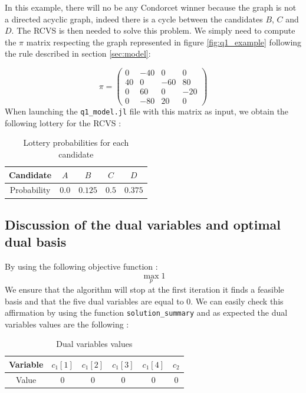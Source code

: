 In this example, there will no be any Condorcet winner because the graph is not a directed acyclic graph, indeed there is a cycle between the candidates $B$, $C$ and $D$.
The RCVS is then needed to solve this problem. We simply need to compute the $\pi$ matrix respecting the graph represented in figure \ref{fig:q1_example} following the rule described in section \ref{sec:model}:

$$\pi = \begin{pmatrix}
  0 & -40 & 0 & 0\\
  40 & 0 & -60 & 80\\
  0 & 60 & 0 & -20\\
  0 & -80 & 20 & 0
\end{pmatrix}$$
\newpage
When launching the \verb|q1_model.jl| file with this matrix as input, we obtain the following lottery for the RCVS :

\begin{table}[!h]
  \centering
  \begin{tabular}{|c|c|c|c|c|}
  \hline
  Candidate   & $A$   & $B$     & $C$   & $D$     \\ \hline
  Probability & $0.0$ & $0.125$ & $0.5$ & $0.375$ \\ \hline
  \end{tabular}
  \caption{Lottery probabilities for each candidate}
  \label{tab:q1_prob}
\end{table}

\subsection{Discussion of the dual variables and optimal dual basis}
By using the following objective function : 
$$\max_p 1$$
We ensure that the algorithm will stop at the first iteration it finds a feasible basis and that the five dual variables are equal to $0$. We can easily check this affirmation by using the function \verb|solution_summary| and as expected the dual variables values are the following :

\begin{table}[!h]
\centering
\begin{tabular}{|c|c|c|c|c|c|}
\hline
Variable & $c_1[1]$ & $c_1[2]$ & $c_1[3]$ & $c_1[4]$ & $c_2$ \\ \hline
Value    & 0        & 0        & 0        & 0        & 0     \\ \hline
\end{tabular}
\caption{Dual variables values}
\label{tab:dual_q1_values}
\end{table}


